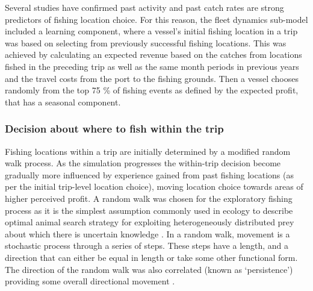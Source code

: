 \documentclass[review]{elsarticle}
\begin{document}
Several studies \citep[for a review]{Girardin2016} have confirmed past activity
and past catch rates are strong predictors of fishing location choice. For this
reason, the fleet dynamics sub-model included a learning component, where a
vessel's initial fishing location in a trip was based on selecting from
previously successful fishing locations. This was achieved by calculating an
expected revenue based on the catches from locations fished in the preceding
trip as well as the same month periods in previous years and the travel costs
from the port to the fishing grounds. Then a vessel chooses randomly from the
top 75 \% of fishing events as defined by the expected profit, that has a
seasonal component. 

\subsubsection{Decision about where to fish within the trip}

Fishing locations within a trip are initially determined by a modified random
walk process. As the simulation progresses the within-trip decision become
gradually more influenced by experience gained from past fishing locations (as
per the initial trip-level location choice), moving location choice towards
areas of higher perceived profit. A random walk was chosen for the exploratory
fishing process as it is the simplest assumption commonly used in ecology to
describe optimal animal search strategy for exploiting heterogeneously
distributed prey about which there is uncertain knowledge
\citep{Viswanathan1999}. In a random walk, movement is a stochastic process
through a series of steps. These steps have a length, and a direction that can
either be equal in length or take some other functional form. The direction of
the random walk was also correlated (known as `persistence') providing some
overall directional movement \citep{Codling2008}. \\
\end{document}
